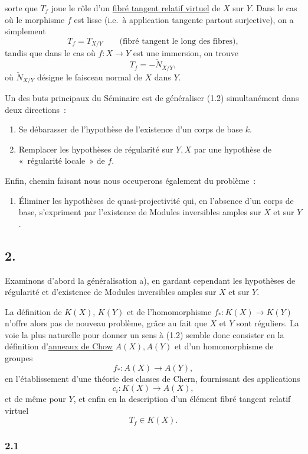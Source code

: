 sorte que $T_f$ joue le rôle d'un \underline{fibré tangent relatif virtuel} de $X$ sur $Y$. Dans le cas où le morphisme $f$ est lisse (i.e.\ à application tangente partout surjective), on a simplement
\[
T_f=T_{X/Y}\qquad\text{(fibré tangent le long des fibres)},
\]
tandis que dans le cas où $f:X\to Y$ est une immersion, on trouve
\[
T_f=-\check N_{X/Y},
\]
où $\check N_{X/Y}$ désigne le faisceau normal de $X$ dans $Y$.

Un des buts principaux du Séminaire est de généraliser (1.2) simultanément dans deux directions~:
\begin{enumerate}[label=\alph*)]
\item Se débarasser de l'hypothèse de l'existence d'un corps de base $k$.
\item Remplacer les hypothèses de régularité sur $Y,X$ par une hypothèse de «~régularité locale~» de $f$.
\end{enumerate}
Enfin, chemin faisant nous nous occuperons également du problème~:
\begin{enumerate}[label=\alph*),start=3]
\item Éliminer les hypothèses de quasi-projectivité qui, en l'absence d'un corps de base, s'expriment par l'existence de Modules inversibles amples sur $X$ et sur $Y$.
\end{enumerate}

\subsection*{2.}
Examinons d'abord la généralisation a), en gardant cependant les hypothèses de régularité et d'existence de Modules inversibles amples sur $X$ et sur $Y$.

La définition de $K(X)$, $K(Y)$ et de l'homomorphisme $f_*:K(X)\to K(Y)$ n'offre alors pas de nouveau problème, grâce au fait que $X$ et $Y$ sont réguliers. La voie la plus naturelle pour donner un sens à (1.2) semble donc consister en la définition d'\underline{anneaux de Chow} $A(X),A(Y)$ et d'un homomorphisme de groupes
\[
f_*:A(X)\longrightarrow A(Y),
\]
en l'établissement d'une théorie des classes de Chern, fournissant des applications
\[
c_i:K(X)\longrightarrow A(X),
\]
et de même pour $Y$, et enfin en la description d'un élément fibré tangent relatif virtuel
\[
T_f\in K(X).
\]

\subsubsection*{2.1}
